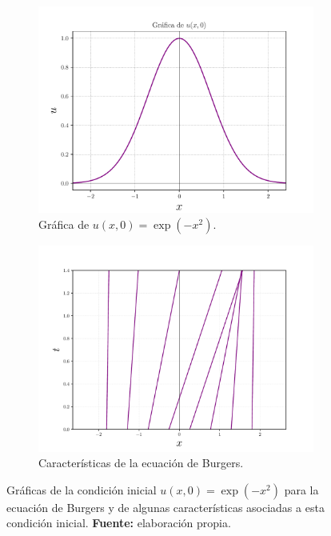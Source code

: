 \begin{figure}
	\begin{subfigure}{0.5\textwidth}
		\centering
		\includegraphics[width=\linewidth]{../some_plots/cond_inicial.pdf}
		\caption{Gráfica de $u(x,0) = \exp(-x^2)$.}
		\label{fig:subfig1}
	\end{subfigure}
	\begin{subfigure}{0.5\textwidth}
		\centering
		\includegraphics[width=\linewidth]{../some_plots/caracteristicas_burgers.pdf}
		\caption{Características de la ecuación de Burgers.}
		\label{fig:subfig2}
	\end{subfigure}
	\caption{Gráficas de la condición inicial $u(x,0) = \exp(-x^2)$ para la ecuación de Burgers y de algunas características asociadas a esta condición inicial. \textbf{Fuente:} elaboración propia.}
	\label{fig:figura_completa}
\end{figure}

